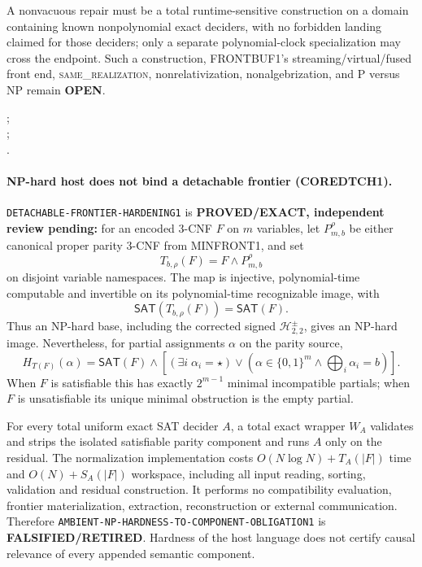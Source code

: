 \documentclass[11pt]{article}
\newcommand{\SAT}{\mathsf{SAT}}
\begin{document}
A nonvacuous repair must be a total runtime-sensitive construction on a
domain containing known nonpolynomial exact deciders, with no forbidden
landing claimed for those deciders; only a separate polynomial-clock
specialization may cross the endpoint.  Such a construction, FRONTBUF1's
streaming/virtual/fused front end, \textsc{same\_realization},
nonrelativization, nonalgebrization, and P versus NP remain \textbf{OPEN}.

;\\
;\\
.

\paragraph{NP-hard host does not bind a detachable frontier (COREDTCH1).}
\texttt{DETACHABLE-FRONTIER-HARDENING1} is
\textbf{PROVED/EXACT, independent review pending:} for an encoded 3-CNF
\(F\) on \(m\) variables, let \(P_{m,b}^{\rho}\) be either canonical
proper parity 3-CNF from MINFRONT1, and set
\[
 T_{b,\rho}(F)=F\wedge P_{m,b}^{\rho}
\]
on disjoint variable namespaces.  The map is injective, polynomial-time
computable and invertible on its polynomial-time recognizable image, with
\[
 \SAT(T_{b,\rho}(F))=\SAT(F).
\]
Thus an NP-hard base, including the corrected signed
\(\mathcal H^{\pm}_{2,2}\), gives an NP-hard image.  Nevertheless, for
partial assignments \(\alpha\) on the parity source,
\[
H_{T(F)}(\alpha)=\SAT(F)\wedge
\left[(\exists i\;\alpha_i=\star)\vee
\left(\alpha\in\{0,1\}^m\wedge\bigoplus_i\alpha_i=b\right)\right].
\]
When \(F\) is satisfiable this has exactly \(2^{m-1}\) minimal incompatible
partials; when \(F\) is unsatisfiable its unique minimal obstruction is the
empty partial.

For every total uniform exact SAT decider \(A\), a total exact wrapper
\(W_A\) validates and strips the isolated satisfiable parity component and
runs \(A\) only on the residual.  The normalization implementation costs
\(O(N\log N)+T_A(|F|)\) time and \(O(N)+S_A(|F|)\) workspace, including all
input reading, sorting, validation and residual construction.  It performs
no compatibility evaluation, frontier materialization, extraction,
reconstruction or external communication.  Therefore
\texttt{AMBIENT-NP-HARDNESS-TO-COMPONENT-OBLIGATION1} is
\textbf{FALSIFIED/RETIRED}.  Hardness of the host language does not certify
causal relevance of every appended semantic component.
\end{document}
